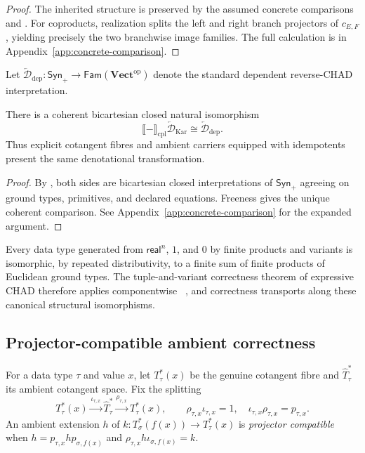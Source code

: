 \documentclass[runningheads,envcountsame]{llncs}
\newcommand{\Vectop}{\mathbf{Vect}^{\mathrm{op}}}
\newcommand{\Synp}{\mathsf{Syn}_{+}}
\newcommand{\Fam}{\mathsf{Fam}}
\newcommand{\Ddep}{\overleftarrow{\mathcal D}_{\mathrm{dep}}}
\newcommand{\DKar}{\overleftarrow{\mathcal D}_{\mathrm{Kar}}}
\begin{document}
\begin{proof}
The inherited structure is preserved by the assumed concrete comparisons and
. For coproducts, realization splits the left
and right branch projectors of $c_{E,F}$, yielding precisely the two branchwise
image families. The full calculation is in Appendix~\ref{app:concrete-comparison}.
\end{proof}

Let $\Ddep:\Synp\to\Fam(\Vectop)$ denote the standard dependent reverse-CHAD
interpretation.

\begin{theorem}
\label{thm:comparison}
There is a coherent bicartesian closed natural isomorphism
$$
\llbracket-\rrbracket_{\mathrm{cpl}}\DKar
\cong
\Ddep.
$$
Thus explicit cotangent fibres and ambient carriers equipped with idempotents
present the same denotational transformation.
\end{theorem}

\begin{proof}
By , both sides are bicartesian closed
interpretations of $\Synp$ agreeing on ground types, primitives, and declared
equations. Freeness gives the unique coherent comparison. See
Appendix~\ref{app:concrete-comparison} for the expanded argument.
\end{proof}

Every data type generated from $\mathsf{real}^n$, $1$, and $0$ by finite
products and variants is isomorphic, by repeated distributivity, to a finite
sum of finite products of Euclidean ground types. The tuple-and-variant
correctness theorem of expressive CHAD therefore applies componentwise
~\cite[Theorem~124]{LucatelliNunesVakar2023}, and correctness transports along
these canonical structural isomorphisms.

\subsection{Projector-compatible ambient correctness}

For a data type $\tau$ and value $x$, let $T^*_\tau(x)$ be the genuine
cotangent fibre and $\widehat T^*_\tau$ its ambient cotangent space. Fix the
splitting
$$
T^*_\tau(x)
\xrightarrow{\iota_{\tau,x}}
\widehat T^*_\tau
\xrightarrow{\rho_{\tau,x}}
T^*_\tau(x),
\qquad
\rho_{\tau,x}\iota_{\tau,x}=1,
\quad
\iota_{\tau,x}\rho_{\tau,x}=p_{\tau,x}.
$$
An ambient extension $h$ of
$k:T^*_\sigma(f(x))\to T^*_\tau(x)$ is \emph{projector compatible} when
$h=p_{\tau,x}hp_{\sigma,f(x)}$ and
$\rho_{\tau,x}h\iota_{\sigma,f(x)}=k$.
\end{document}
